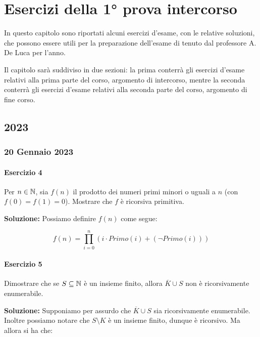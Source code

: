 \chapter{Esercizi della 1° prova intercorso}

In questo capitolo sono riportati alcuni esercizi d'esame, con le relative soluzioni, che possono essere utili per la preparazione dell'esame di \documentname{} tenuto dal professore A. De Luca per l'anno\documentyear.

Il capitolo sarà suddiviso in due sezioni: la prima conterrà gli esercizi d'esame relativi alla prima parte del corso, argomento di intercorso, mentre la seconda conterrà gli esercizi d'esame relativi alla seconda parte del corso, argomento di fine corso.

\section{2023}

\subsection{20 Gennaio 2023}

\subsubsection{Esercizio 4}

Per \(n\in \mathbb{N}\), sia \(f(n)\) il prodotto dei numeri primi minori o uguali a \(n\) (con \(f(0)=f(1)=0\)). Mostrare che \(f\) è ricorsiva primitiva.

\textbf{Soluzione: } Possiamo definire \(f(n)\) come segue:

\begin{equation}
  f(n) = \prod_{i=0}^{n} (i \cdot Primo(i) +  (\neg Primo(i)))
\end{equation}

\subsubsection{Esercizio 5}

Dimostrare che se \(S \subseteq \mathbb{N}\) è un insieme finito, allora \(\overline{K} \cup S\) non è ricorsivamente enumerabile.

\textbf{Soluzione: } Supponiamo per assurdo che \(\overline{K} \cup S\) sia ricorsivamente enumerabile. Inoltre possiamo notare che \(S \setminus K\) è un insieme finito, dunque è ricorsivo. Ma allora si ha che:

